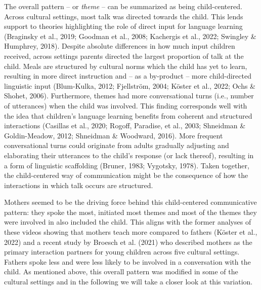 \documentclass[
  man,floatsintext]{apa6}
\begin{document}
The overall pattern -- or \emph{theme} -- can be summarized as being child-centered. Across cultural settings, most talk was directed towards the child. This lends support to theories highlighting the role of direct input for language learning (Braginsky et al., 2019; Goodman et al., 2008; Kachergis et al., 2022; Swingley \& Humphrey, 2018). Despite absolute differences in how much input children received, across settings parents directed the largest proportion of talk at the child. Meals are structured by cultural norms which the child has yet to learn, resulting in more direct instruction and -- as a by-product -- more child-directed linguistic input (Blum-Kulka, 2012; Fjellström, 2004; Köster et al., 2022; Ochs \& Shohet, 2006). Furthermore, themes had more conversational turns (i.e., number of utterances) when the child was involved. This finding corresponds well with the idea that children's language learning benefits from coherent and structured interactions (Casillas et al., 2020; Rogoff, Paradise, et al., 2003; Shneidman \& Goldin-Meadow, 2012; Shneidman \& Woodward, 2016). More frequent conversational turns could originate from adults gradually adjusting and elaborating their utterances to the child's response (or lack thereof), resulting in a form of linguistic scaffolding (Bruner, 1983; Vygotsky, 1978). Taken together, the child-centered way of communication might be the consequence of how the interactions in which talk occurs are structured.

Mothers seemed to be the driving force behind this child-centered communicative pattern: they spoke the most, initiated most themes and most of the themes they were involved in also included the child. This aligns with the former analyses of these videos showing that mothers teach more compared to fathers (Köster et al., 2022) and a recent study by Broesch et al. (2021) who described mothers as the primary interaction partners for young children across five cultural settings. Fathers spoke less and were less likely to be involved in a conversation with the child. As mentioned above, this overall pattern was modified in some of the cultural settings and in the following we will take a closer look at this variation.
\end{document}
